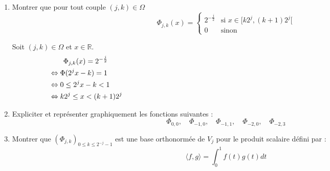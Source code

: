 \documentclass[12pt,a4paper]{article}
\begin{document}
\begin{enumerate}
    \color{black}
    \item Montrer que pour tout couple $(j,k) \in \Omega$
    $$
    \Phi_{j,k}(x) = \begin{cases}
    2^{-\frac{j}{2}} & \text{si } x \in [k2^{j}, (k+1)2^{j}[ \\
    0 & \text{sinon}
    \end{cases}
    $$

    \color{blue}
    Soit $(j,k) \in \Omega$ et $x \in \mathbb{R}$.
    \begin{align*}
        & \qquad \Phi_{j,k}(x) = 2^{-\frac{j}{2}} \hspace{14.5cm} \\
        & \Leftrightarrow \Phi(2^j x - k) = 1 \\
        & \Leftrightarrow 0 \leq 2^j x - k < 1 \\
        & \Leftrightarrow k2^j \leq x < (k+1)2^j \\
    \end{align*}
     

    \color{black}
    \item Expliciter et représenter graphiquement les fonctions suivantes :
    $$
    \Phi_{0,0}, \quad \Phi_{-1,0}, \quad \Phi_{-1,1}, \quad \Phi_{-2,0}, \quad \Phi_{-2,3}
    $$

    \color{blue}


    \color{black}
    \item Montrer que $(\Phi_{j,k})_{0 \leq k \leq 2^{-j} - 1}$ est une base orthonormée de $V_j$ pour le produit scalaire défini par :
    \begin{equation}
        \langle f, g \rangle = \int_{0}^{1} f(t) g(t) dt
    \end{equation}


\end{enumerate}
\end{document}
